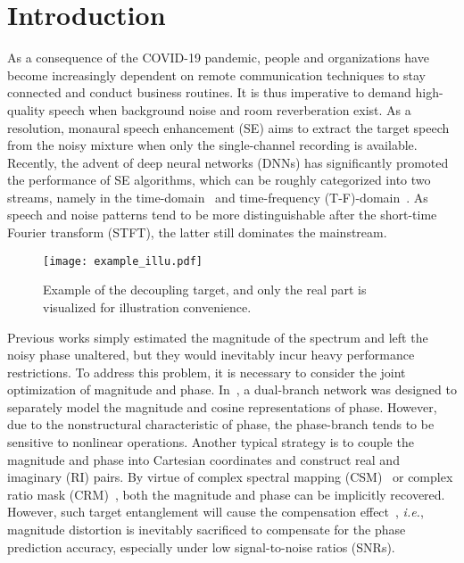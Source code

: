 \documentclass{article}
\begin{document}
\section{Introduction}
\label{sec:introduction}
As a consequence of the COVID-19 pandemic, people and organizations have become increasingly dependent on remote communication techniques to stay connected and conduct business routines. It is thus imperative to demand high-quality speech when background noise and room reverberation exist. As a resolution, monaural speech enhancement (SE) aims to extract the target speech from the noisy mixture when only the single-channel recording is available. Recently, the advent of deep neural networks (DNNs) has significantly promoted the performance of SE algorithms, which can be roughly categorized into two streams, namely in the time-domain~{\cite{pascual2017segan,luo2019conv}} and time-frequency (T-F)-domain~{\cite{yin2020phasen,tang2021joint}}. As speech and noise patterns tend to be more distinguishable after the short-time Fourier transform (STFT), the latter still dominates the mainstream.
\begin{figure}[t]
	\centering
	\centerline{\texttt{[image: example\_illu.pdf]}}
	\caption{Example of the decoupling target, and only the real part is visualized for illustration convenience.}
	\label{fig:example}
	\vspace{-0.5cm}
\end{figure}
Previous works simply estimated the magnitude of the spectrum and left the noisy phase unaltered, but they would inevitably incur heavy performance restrictions. To address this problem, it is necessary to consider the joint optimization of magnitude and phase. In~{\cite{yin2020phasen}}, a dual-branch network was designed to separately model the magnitude and cosine representations of phase. However, due to the nonstructural characteristic of phase, the phase-branch tends to be sensitive to nonlinear operations. Another typical strategy is to couple the magnitude and phase into Cartesian coordinates and construct real and imaginary (RI) pairs. By virtue of complex spectral mapping (CSM)~{\cite{tan2020learning}} or complex ratio mask (CRM)~{\cite{williamson2015complex}}, both the magnitude and phase can be implicitly recovered. However, such target entanglement will cause the compensation effect~{\cite{wang2021compensation}}, \emph{i.e.}, magnitude distortion is inevitably sacrificed to compensate for the phase prediction accuracy, especially under low signal-to-noise ratios (SNRs).
\end{document}
